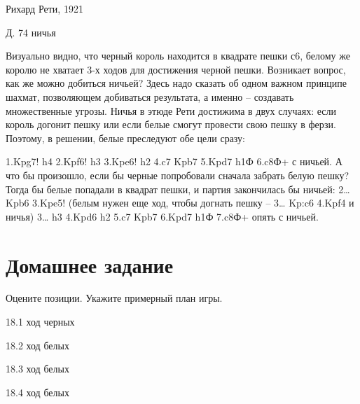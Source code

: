 Рихард Рети, 1921
 
Д. 74 ничья

Визуально видно, что черный король находится в квадрате пешки с6, белому же королю не хватает 3-х ходов для достижения черной пешки. Возникает вопрос, как же можно добиться ничьей? Здесь надо сказать об одном важном принципе шахмат, позволяющем добиваться результата, а именно – создавать множественные угрозы. Ничья в этюде Рети достижима в двух случаях: если король догонит пешку или если белые смогут провести свою пешку в ферзи. Поэтому, в решении, белые преследуют обе цели сразу:

1.Kpg7! h4 2.Kpf6! h3 3.Kpe6! h2 4.c7 Kpb7 5.Kpd7 h1Ф 6.c8Ф+ с ничьей. А что бы произошло, если бы черные попробовали сначала забрать белую пешку? Тогда бы белые попадали в квадрат пешки, и партия закончилась бы ничьей:
2… Kpb6 3.Kpe5! (белым нужен еще ход, чтобы догнать пешку – 3… Kp:c6 4.Kpf4 и ничья) 3… h3 4.Kpd6 h2 5.c7 Kpb7 6.Kpd7 h1Ф 7.c8Ф+ опять с ничьей.

\section{Домашнее задание}

Оцените позиции. Укажите примерный план игры.
 
 
18.1 ход черных
 
18.2 ход белых
 
 
18.3 ход белых
 
18.4 ход белых
